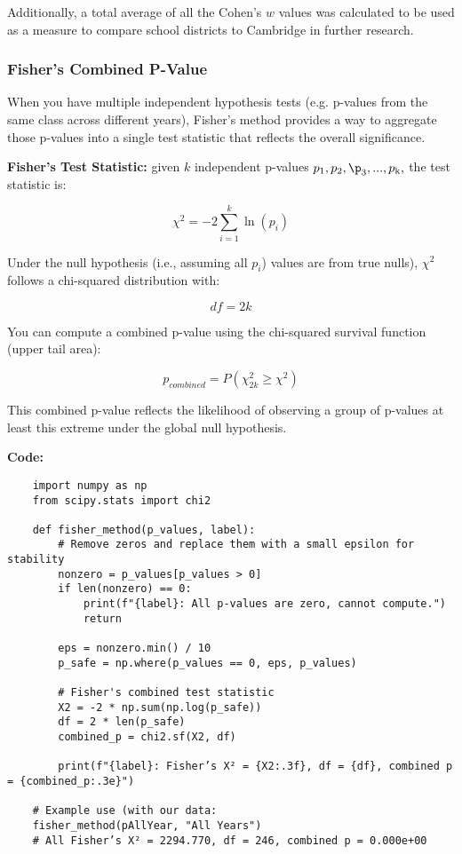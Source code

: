 \documentclass{article}
\begin{document}
Additionally, a total average of all the Cohen's \(w\) values was calculated to be used as a measure to compare school districts to Cambridge in further research.

\subsubsection{Fisher's Combined P-Value}

When you have multiple independent hypothesis tests (e.g. p-values from the same class across different years), Fisher's method provides a way to aggregate those p-values into a single test statistic that reflects the overall significance.

\textbf{Fisher's Test Statistic:}
given \(k\) independent p-values \(p_\text{1}, p_\text{2},\p_\text{3}, ... , p_\text{k},\) the test statistic is:

\[
\chi^2 = -2\sum_{i=1}^{k}\ln({p_i})
\]

Under the null hypothesis (i.e., assuming all \(p_i\)) values are from true nulls), \(\chi^2\) follows a chi-squared distribution with:

\[
df = 2k
\]

You can compute a combined p-value using the chi-squared survival function (upper tail area):

\[
p_{combined} = P(\chi^{2}_{2k}\geq \chi^2) 
\]

This combined p-value reflects the likelihood of observing a group of p-values at least this extreme under the global null hypothesis.

\textbf{Code:}
    \begin{verbatim}
    import numpy as np
    from scipy.stats import chi2
    
    def fisher_method(p_values, label):
        # Remove zeros and replace them with a small epsilon for stability
        nonzero = p_values[p_values > 0]
        if len(nonzero) == 0:
            print(f"{label}: All p-values are zero, cannot compute.")
            return
    
        eps = nonzero.min() / 10
        p_safe = np.where(p_values == 0, eps, p_values)
    
        # Fisher's combined test statistic
        X2 = -2 * np.sum(np.log(p_safe))
        df = 2 * len(p_safe)
        combined_p = chi2.sf(X2, df)
    
        print(f"{label}: Fisher’s X² = {X2:.3f}, df = {df}, combined p = {combined_p:.3e}")
    
    # Example use (with our data:
    fisher_method(pAllYear, "All Years")
    # All Fisher’s X² = 2294.770, df = 246, combined p = 0.000e+00
    \end{verbatim}
\end{document}

